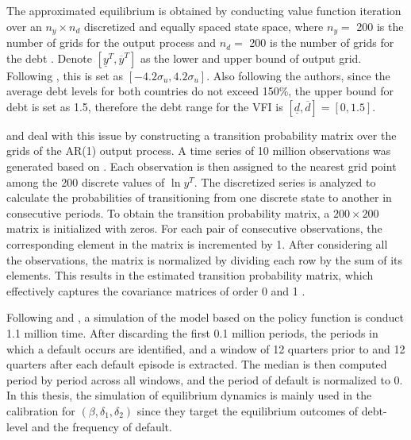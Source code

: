 The approximated equilibrium is obtained by conducting value function iteration over an $n_y \times n_d$ discretized and equally spaced state space,
where $n_y = $ 200 is the number of grids for the output process and $n_d=$ 200 is the number of grids for the debt \citep{Na-18}. Denote $[\underline{y}^T, \overline{y}^T]$ as the lower and upper bound of output grid. Following \citet{Uribe-Schmitt-Grohe-textbook}, this is set as $[-4.2 \sigma_u, 4.2 \sigma_u]$. Also following the authors, since the average debt levels for both countries do not exceed 150\%, the upper bound for debt is set as 1.5, therefore the debt range for the VFI is $[\underline{d}, \overline{d}]=[0,1.5]$.

\citet{Schmitt-Uribe-16} and \citet{Na-18} deal with this issue by constructing a transition probability matrix over the grids of the AR(1) output process.
A time series of 10 million observations was generated based on . Each observation is then assigned to the nearest grid point among the 200 discrete values of $\ln y^T$. The discretized series is analyzed to calculate the probabilities of transitioning from one discrete state to another in consecutive periods.
To obtain the transition probability matrix, a $200\times200$ matrix is initialized with zeros. For each pair of consecutive observations, the corresponding element in the matrix is incremented by 1. After considering all the observations, the matrix is normalized by dividing each row by the sum of its elements. This results in the estimated transition probability matrix, which effectively captures the covariance matrices of order 0 and 1
\citep*{Uribe-Schmitt-Grohe-textbook}.

Following \citet{Schmitt-Uribe-16}
and \citet{Na-18}, a simulation of the model based on the policy function is conduct 1.1 million time. After discarding the first 0.1 million periods, the periods in which a default occurs are identified, and a window of 12 quarters prior to and 12 quarters after each default episode is extracted. The median is then computed period by period across all windows, and the period of default is normalized to 0. In this thesis, the simulation of equilibrium dynamics is mainly used in the calibration for $(\beta, \delta_1, \delta_2)$ since they target the equilibrium outcomes of debt-level and the frequency of default.